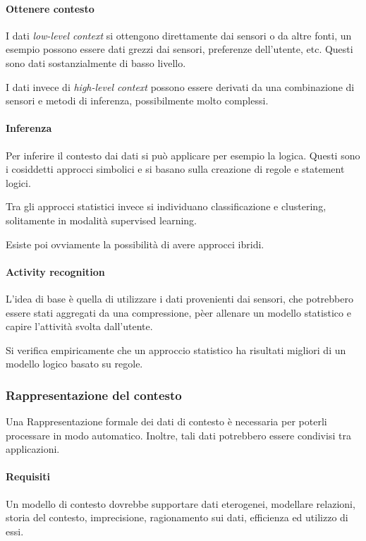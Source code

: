 \paragraph{Ottenere contesto}
I dati \emph{low-level context} si ottengono direttamente dai sensori o da 
altre fonti, un esempio possono essere dati grezzi dai sensori, preferenze dell'utente, etc.
Questi sono dati sostanzialmente di basso livello.

I dati invece di \emph{high-level context} possono essere derivati da una combinazione di 
sensori e metodi di inferenza, possibilmente molto complessi.

\paragraph{Inferenza}
Per inferire il contesto dai dati si può applicare per esempio la logica. Questi 
sono i cosiddetti approcci simbolici e si basano sulla creazione di regole 
e statement logici.

Tra gli approcci statistici invece si individuano classificazione e clustering, 
solitamente in modalità supervised learning.

Esiste poi ovviamente la possibilità di avere approcci ibridi.

\paragraph{Activity recognition}
L'idea di base è quella di utilizzare i dati provenienti
dai sensori, che potrebbero essere stati aggregati 
da una compressione, pèer allenare un modello statistico 
e capire l'attività svolta dall'utente.

Si verifica empiricamente che un approccio statistico 
ha risultati migliori di un modello logico basato su regole.

\subsubsection{Rappresentazione del contesto}

Una Rappresentazione formale dei dati di contesto 
è necessaria per poterli processare in modo automatico. 
Inoltre, tali dati potrebbero essere condivisi tra applicazioni. 

\paragraph{Requisiti}
Un modello di contesto dovrebbe supportare dati eterogenei, 
modellare relazioni, storia del contesto, imprecisione, 
ragionamento sui dati, efficienza ed utilizzo di essi.

